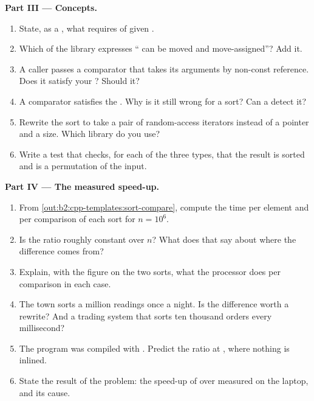 \begin{problem}
\medskip\noindent\textbf{Part III --- Concepts.}\par\nopagebreak
\begin{enumerate}[resume, beginpenalty=10000]
\item State, as a , what  requires of  given .
\item Which  of the library expresses `` can be moved and move-assigned''? Add it.
\item A caller passes a comparator that takes its arguments by non-const reference. Does it satisfy your ?
Should it?
\item A comparator  satisfies the . Why is it still wrong for a
sort? Can a  detect it?
\item Rewrite the sort to take a pair of random-access iterators instead of a pointer and a size. Which library
 do you use?
\item Write a test that checks, for each of the three types, that the result is sorted and is a permutation of the
input.
\end{enumerate}

\medskip\noindent\textbf{Part IV --- The measured speed-up.}\par\nopagebreak
\begin{enumerate}[resume, beginpenalty=10000]
\item From \cref{out:b2:cpp-templates:sort-compare}, compute the time per element and per comparison of each sort
for $n = 10^6$.
\item Is the ratio roughly constant over $n$? What does that say about where the difference comes from?
\item Explain, with the figure on the two sorts, what the processor does per comparison in each case.
\item The town sorts a million readings once a night. Is the difference worth a rewrite? And a trading system that
sorts ten thousand orders every millisecond?
\item The  program was compiled with . Predict the ratio at , where nothing
is inlined.
\item State the result of the problem: the speed-up of  over  measured on the laptop, and
its cause.
\end{enumerate}
\end{problem}
